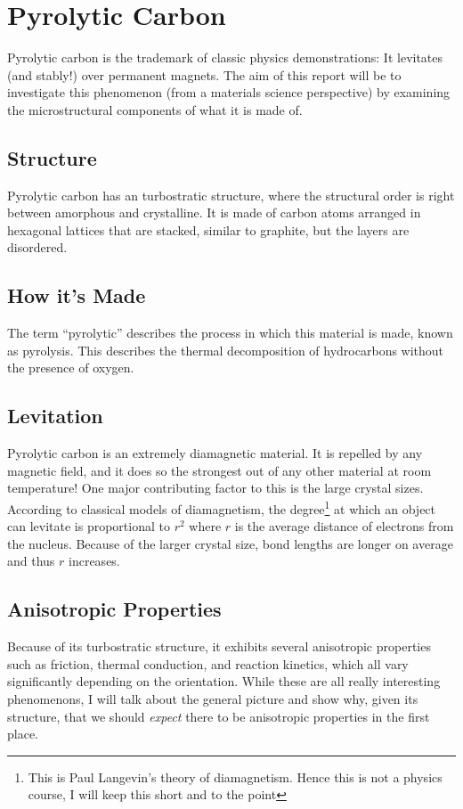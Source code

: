 \documentclass{article}
\begin{document}
    \newpage
    \section{Pyrolytic Carbon}
    Pyrolytic carbon is the trademark of classic physics demonstrations: It levitates (and stably!) over permanent magnets. The aim of this report will be to investigate this phenomenon (from a materials science perspective) by examining the microstructural components of what it is made of.
    \subsection{Structure}
    Pyrolytic carbon has an turbostratic structure, where the structural order is right between amorphous and crystalline. It is made of carbon atoms arranged in hexagonal lattices that are stacked, similar to graphite, but the layers are disordered.\cite{azom}
    \subsection{How it's Made}
    The term ``pyrolytic'' describes the process in which this material is made, known as pyrolysis. This describes the thermal decomposition of hydrocarbons without the presence of oxygen.\cite{pyro}
    \subsection{Levitation}
    Pyrolytic carbon is an extremely diamagnetic material. It is repelled by any magnetic field, and it does so the strongest out of any other material at room temperature!\cite{dia} One major contributing factor to this is the large crystal sizes. According to classical models of diamagnetism, the degree\footnote{This is Paul Langevin's theory of diamagnetism. Hence this is not a physics course, I will keep this short and to the point} at which an object can levitate is proportional to $r^2$ where $r$ is the average distance of electrons from the nucleus. Because of the larger crystal size, bond lengths are longer on average and thus $r$ increases.

    \subsection{Anisotropic Properties}
    Because of its turbostratic structure, it exhibits several anisotropic properties such as friction\cite{XIAO201353}, thermal conduction\cite{WANG2018476}, and reaction kinetics\cite{Horton1970}, which all vary significantly depending on the orientation. While these are all really interesting phenomenons, I will talk about the general picture and show why, given its structure, that we should \textit{expect} there to be anisotropic properties in the first place.

    \newpage
    \printbibliography
\end{document}
